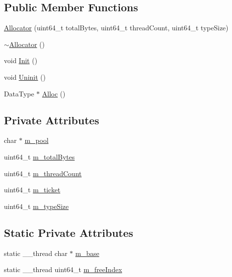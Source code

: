 \subsection*{Public Member Functions}
\begin{DoxyCompactItemize}
\item 
\hyperlink{classAllocator_a7ffd15c2cebf761a173307aa89517d01}{Allocator} (uint64\-\_\-t total\-Bytes, uint64\-\_\-t thread\-Count, uint64\-\_\-t type\-Size)
\item 
\hyperlink{classAllocator_a64cef0c8851f0b794ef310beccb0f436}{$\sim$\-Allocator} ()
\item 
void \hyperlink{classAllocator_aa469d492c52035a021a9e863560cfe39}{Init} ()
\item 
void \hyperlink{classAllocator_a739d7203efcace30033322b180906c08}{Uninit} ()
\item 
Data\-Type $\ast$ \hyperlink{classAllocator_ab991ae25a95eb984d8ef4e2d12db6178}{Alloc} ()
\end{DoxyCompactItemize}
\subsection*{Private Attributes}
\begin{DoxyCompactItemize}
\item 
char $\ast$ \hyperlink{classAllocator_abb29c2eec72c880e29f9d74dfd4a763c}{m\-\_\-pool}
\item 
uint64\-\_\-t \hyperlink{classAllocator_aea41e7ddad87fc724440019ca0065949}{m\-\_\-total\-Bytes}
\item 
uint64\-\_\-t \hyperlink{classAllocator_a56b1f47232f76bed6e1971119e9e6425}{m\-\_\-thread\-Count}
\item 
uint64\-\_\-t \hyperlink{classAllocator_a81d11637a666e7f3822ac78fa43d1b88}{m\-\_\-ticket}
\item 
uint64\-\_\-t \hyperlink{classAllocator_a569f32c5cfab86005b7a40ae966d3f5c}{m\-\_\-type\-Size}
\end{DoxyCompactItemize}
\subsection*{Static Private Attributes}
\begin{DoxyCompactItemize}
\item 
static \-\_\-\-\_\-thread char $\ast$ \hyperlink{classAllocator_a470c76fbdd00585861285728a1d67144}{m\-\_\-base}
\item 
static \-\_\-\-\_\-thread uint64\-\_\-t \hyperlink{classAllocator_abae17a424e857c97b3ab19e91f27b632}{m\-\_\-free\-Index}
\end{DoxyCompactItemize}



